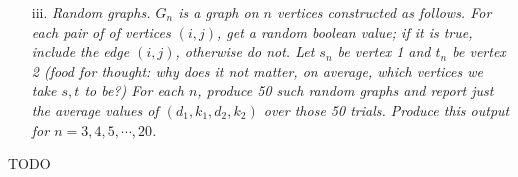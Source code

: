 \documentclass[12pt]{article} \setlength{\oddsidemargin}{0in}
\begin{document}
\begin{enumerate}
{\begin{enumerate}
\item[iii.] \textit{Random graphs. $G_n$ is a graph on $n$ vertices constructed as follows. For each
pair of of vertices $(i, j)$, get a random boolean value; if it is true, include
the edge $(i, j)$, otherwise do not. Let $s_n$ be vertex 1 and $t_n$ be vertex 2 (food
for thought: why does it not matter, on average, which vertices we take $s, t$
to be?) For each $n$, produce 50 such random graphs and report just the
average values of $(d_1, k_ 1, d_2, k_2 )$ over those 50 trials. Produce this output for $n = 3, 4, 5, \cdots, 20$.}
    \end{enumerate}
  }

  TODO

\end{enumerate}



\end{document}
